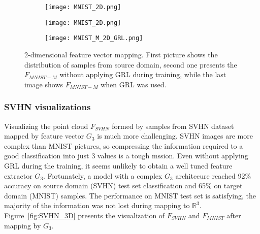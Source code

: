 \documentclass{article}
\begin{document}
\begin{figure}[htb]%
    \centering
    
    \begin{subfigure}[b]{0.33\textwidth}
        \texttt{[image: MNIST\_2D.png]}
    \end{subfigure}%
    \begin{subfigure}[b]{0.33\textwidth}
        \texttt{[image: MNIST\_2D.png]}
    \end{subfigure}%
    \begin{subfigure}[b]{0.33\textwidth}
        \texttt{[image: MNIST\_M\_2D\_GRL.png]}
    \end{subfigure}%
    
    \caption{2-dimensional feature vector mapping. First picture shows the distribution of samples from source domain, second one presents the $F_{MNIST-M}$ without applying GRL during training, while the last image shows $F_{MNIST-M}$ when GRL was used.}%
    \label{fig:2D}%
\end{figure}

\subsubsection{SVHN visualizations}
\par
Visualizing the point cloud $F_{SVHN}$ formed by samples from SVHN dataset mapped by feature vector $G_{3}$ is much more challenging. SVHN images are more complex than MNIST pictures, so compressing the information required to a good classification into just 3 values is a tough mssion. Even without applying GRL during the training, it seems unlikely to obtain a well tuned feature extractor $G_{3}$. Fortunately, a model with a complex $G_{3}$ architecure reached 92\% accuracy on source domain (SVHN) test set classification and 65\% on target domain (MNIST) samples. The performance on MNIST test set is satisfying, the majority of the information was not lost during mapping to $\mathbb{R}^{3}$. Figure~\ref{fig:SVHN_3D} presents the visualization of $F_{SVHN}$ and $F_{MNIST}$ after mapping by $G_{3}$.
\end{document}
